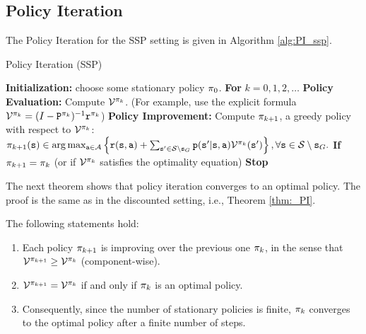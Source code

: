 \subsection{Policy Iteration}
The Policy Iteration for the SSP setting is given in Algorithm \ref{alg:PI_ssp}.

\begin{algorithm}
\caption{Policy Iteration (SSP)}
\label{alg:PI_ssp}
\begin{algorithmic}[1]
\State \textbf{Initialization:} choose some stationary policy $\pi_0$.
\State \textbf{For} {$k = 0, 1, 2,\ldots$}
    \State \quad \textbf{Policy Evaluation:} Compute $\mathcal{V}^{\pi_k}$.
    \State \quad \quad (For example, use the explicit formula $\mathcal{V}^{\pi_k} = (I - {\tt P}^{\pi_k})^{-1}{\tt r}^{\pi_k}$)
    \State \quad \textbf{Policy Improvement:} Compute $\pi_{k+1}$, a greedy policy with respect to $\mathcal{V}^{\pi_k}$:
    \State \quad $\pi_{k+1}({\tt s}) \in \arg \max_{{\tt a} \in \mathcal{A}} \left\{ {\tt r}({\tt s},{\tt a}) + \sum_{{\tt s}' \in \mathcal{S} \setminus {\tt s}_G} {\tt p}({\tt s}'|{\tt s},{\tt a})\mathcal{V}^{\pi_k}({\tt s}') \right\}, \forall {\tt s} \in \mathcal{S} \setminus {\tt s}_G.$
    \State \quad \textbf{If} $\pi_{k+1} = \pi_k$ (or if $\mathcal{V}^{\pi_k}$ satisfies the optimality equation)
    \State \quad \quad \textbf{Stop}
\end{algorithmic}
\end{algorithm}

The next theorem shows that policy iteration converges to an optimal policy. The proof is the same as in the discounted setting, i.e., Theorem \ref{thm:_PI}.

\begin{theorem}\label{thm:_PI_ssp}
The following statements hold:
\begin{enumerate}
  \item Each policy ${\pi _{k + 1}}$ is improving over the previous one ${\pi _k}$, in the sense that ${\mathcal{V}^{{\pi _{k + 1}}}} \ge {\mathcal{V}^{{\pi_k}}}$ (component-wise).
  \item ${\mathcal{V}^{{\pi _{k + 1}}}} = {\mathcal{V}^{{\pi _k}}}$ if and only if ${\pi _k}$ is an optimal policy.
  \item Consequently, since the number of stationary policies is finite, ${\pi _k}$ converges to the optimal policy after a finite number of steps.
\end{enumerate}
\end{theorem}

